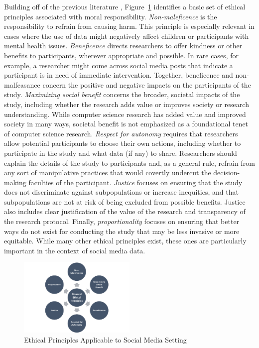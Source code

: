 \documentclass[11pt]{article} %
\begin{document}
Building off of the previous literature \cite{ozkula2020,b88a5a9441354a02ac5b105291fff917,10.1177/1556264619901215,10.1080/15265161.2019.1611278,us1979belmont}, Figure~\ref{fig:ethical-pillars} identifies a basic set of ethical principles associated with moral responsibility. \textit{Non-maleficence} is the responsibility to refrain from causing harm. This principle is especially relevant in cases where the use of data might negatively affect children or participants with mental health issues. \textit{Beneficence} directs researchers to offer kindness or other benefits to participants, wherever appropriate and possible. In rare cases, for example, a researcher might come across social media posts that indicate a participant is in need of immediate intervention. Together, beneficence and non-malfeasance concern the positive and negative impacts on the participants of the study. \textit{Maximizing social benefit} concerns the broader, societal impacts of the study, including whether the research adds value or improves society or research understanding. While computer science research has added value and improved society in many ways, societal benefit is not emphasized as a foundational tenet of computer science research. \textit{Respect for autonomy} requires that researchers allow potential participants to choose their own actions, including whether to participate in the study and what data (if any) to share. Researchers should explain the details of the study to participants and, as a general rule, refrain from any sort of manipulative practices that would covertly undercut the decision-making faculties of the participant. \textit{Justice} focuses on ensuring that the study does not discriminate against subpopulations or increase inequities, and that subpopulations are not at risk of being excluded from possible benefits. Justice also includes clear justification of the value of the research and transparency of the research protocol. Finally, \textit{proportionality} focuses on ensuring that better ways do not exist for conducting the study that may be less invasive or more equitable. While many other ethical principles exist, these ones are particularly important in the context of social media data.

\begin{figure}[tb]
	\centering
        	\includegraphics[width=0.5\textwidth]{figs/ethical-pillars3.png}
	\caption{Ethical Principles Applicable to Social Media Setting}
	\label{fig:ethical-pillars}
\end{figure}
\end{document}
